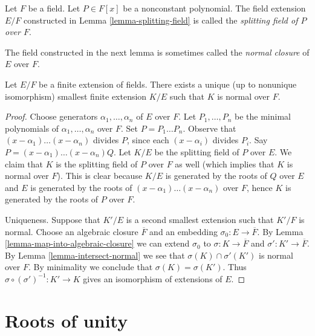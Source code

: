 \begin{definition}
\label{definition-splitting-field}
Let $F$ be a field. Let $P \in F[x]$ be a nonconstant polynomial.
The field extension $E/F$ constructed in Lemma \ref{lemma-splitting-field}
is called the {\it splitting field of $P$ over $F$}.
\end{definition}

\noindent
The field constructed in the next lemma is sometimes called the
{\it normal closure} of $E$ over $F$.

\begin{lemma}
\label{lemma-normal-closure}
Let $E/F$ be a finite extension of fields. There exists a unique
(up to nonunique isomorphism) smallest finite extension $K/E$ such
that $K$ is normal over $F$.
\end{lemma}

\begin{proof}
Choose generators $\alpha_1, \ldots, \alpha_n$ of $E$ over $F$.
Let $P_1, \ldots, P_n$ be the minimal polynomials of
$\alpha_1, \ldots, \alpha_n$ over $F$. Set $P = P_1 \ldots P_n$.
Observe that $(x - \alpha_1) \ldots (x - \alpha_n)$ divides $P$, since
each $(x - \alpha_i)$ divides $P_i$. Say
$P = (x - \alpha_1) \ldots (x - \alpha_n)Q$.
Let $K/E$ be the splitting field of $P$ over $E$.
We claim that $K$ is the splitting field of $P$ over $F$ as well
(which implies that $K$ is normal over $F$).
This is clear because $K/E$ is generated by the roots of
$Q$ over $E$ and $E$ is generated by the roots of
$(x - \alpha_1) \ldots (x - \alpha_n)$ over $F$, hence
$K$ is generated by the roots of $P$ over $F$.

\medskip\noindent
Uniqueness. Suppose that $K'/E$ is a second smallest extension such that
$K'/F$ is normal. Choose an algebraic closure $\overline{F}$ and an
embedding $\sigma_0 : E \to \overline{F}$. By
Lemma \ref{lemma-map-into-algebraic-closure}
we can extend $\sigma_0$ to $\sigma : K \to \overline{F}$ and
$\sigma' : K' \to \overline{F}$.
By Lemma \ref{lemma-intersect-normal} we see that
$\sigma(K) \cap \sigma'(K')$ is normal over $F$.
By minimality we conclude that $\sigma(K) = \sigma(K')$.
Thus $\sigma \circ (\sigma')^{-1} : K' \to K$ gives an isomorphism
of extensions of $E$.
\end{proof}









\section{Roots of unity}
\label{section-roots-of-1}

